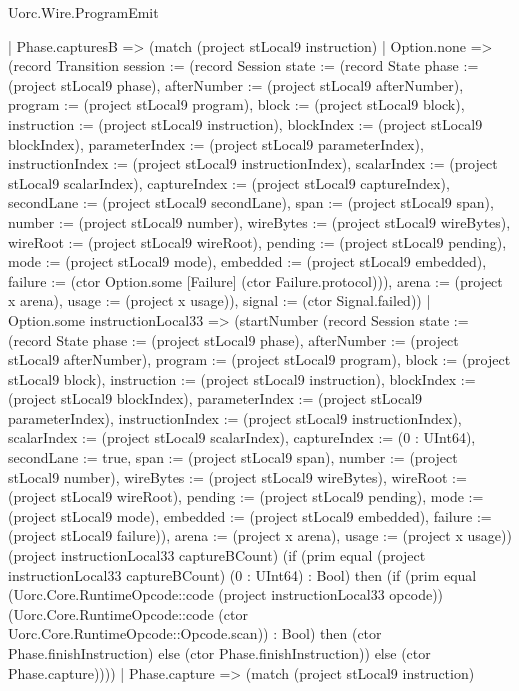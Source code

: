 \begin{lexlean}{Uorc.Wire.ProgramEmit}
\begin{semanticmodule}
{        | Phase.capturesB => (match (project stLocal9 instruction)
          | Option.none => (record Transition {session := (record Session {state := (record State {phase := (project stLocal9 phase), afterNumber := (project stLocal9 afterNumber), program := (project stLocal9 program), block := (project stLocal9 block), instruction := (project stLocal9 instruction), blockIndex := (project stLocal9 blockIndex), parameterIndex := (project stLocal9 parameterIndex), instructionIndex := (project stLocal9 instructionIndex), scalarIndex := (project stLocal9 scalarIndex), captureIndex := (project stLocal9 captureIndex), secondLane := (project stLocal9 secondLane), span := (project stLocal9 span), number := (project stLocal9 number), wireBytes := (project stLocal9 wireBytes), wireRoot := (project stLocal9 wireRoot), pending := (project stLocal9 pending), mode := (project stLocal9 mode), embedded := (project stLocal9 embedded), failure := (ctor Option.some [Failure] (ctor Failure.protocol))}), arena := (project x arena), usage := (project x usage)}), signal := (ctor Signal.failed)})
          | Option.some instructionLocal33 => (startNumber (record Session {state := (record State {phase := (project stLocal9 phase), afterNumber := (project stLocal9 afterNumber), program := (project stLocal9 program), block := (project stLocal9 block), instruction := (project stLocal9 instruction), blockIndex := (project stLocal9 blockIndex), parameterIndex := (project stLocal9 parameterIndex), instructionIndex := (project stLocal9 instructionIndex), scalarIndex := (project stLocal9 scalarIndex), captureIndex := (0 : UInt64), secondLane := true, span := (project stLocal9 span), number := (project stLocal9 number), wireBytes := (project stLocal9 wireBytes), wireRoot := (project stLocal9 wireRoot), pending := (project stLocal9 pending), mode := (project stLocal9 mode), embedded := (project stLocal9 embedded), failure := (project stLocal9 failure)}), arena := (project x arena), usage := (project x usage)}) (project instructionLocal33 captureBCount) (if (prim equal (project instructionLocal33 captureBCount) (0 : UInt64) : Bool) then (if (prim equal (Uorc.Core.RuntimeOpcode::code (project instructionLocal33 opcode)) (Uorc.Core.RuntimeOpcode::code (ctor Uorc.Core.RuntimeOpcode::Opcode.scan)) : Bool) then (ctor Phase.finishInstruction) else (ctor Phase.finishInstruction)) else (ctor Phase.capture))))
        | Phase.capture => (match (project stLocal9 instruction)
}
\end{semanticmodule}
\end{lexlean}
